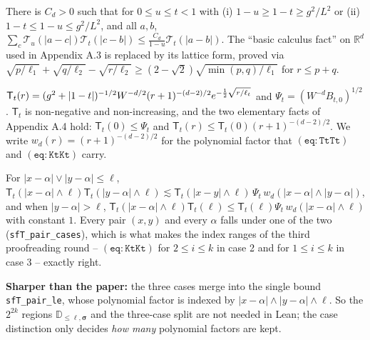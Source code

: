 \begin{lemma}\label{lem:propT-TTT2}
  \leanok
  There is $C_d>0$ such that for $0\le u\le t<1$ with (i) $1-u\ge1-t\ge g^2/L^2$ or
  (ii) $1-t\le1-u\le g^2/L^2$, and all $a,b$,
  $\sum_c\mathcal T_u(|a-c|)\mathcal T_t(|c-b|)\le\frac{C_d}{1-u}\mathcal T_t(|a-b|)$.
  The ``basic calculus fact'' on $\mathbb R^d$ used in Appendix A.3 is replaced by its
  lattice form, proved via $\sqrt{p/\ell_1}+\sqrt{q/\ell_2}-\sqrt{r/\ell_2}\ge(2-\sqrt2)\sqrt{\min(p,q)/\ell_1}$ for $r\le p+q$.
\end{lemma}



\begin{definition}\label{def:sfT}
  \leanok
  $\mathsf T_t(r)=(g^2+|1-t|)^{-1/2}W^{-d/2}(r+1)^{-(d-2)/2}e^{-\frac12\sqrt{r/\ell_t}}$ and
  $\Psi_t=(W^{-d}B_{t,0})^{1/2}$.  $\mathsf T_t$ is non-negative and non-increasing, and the
  two elementary facts of Appendix A.4 hold: $\mathsf T_t(0)\le\Psi_t$ and
  $\mathsf T_t(r)\le\mathsf T_t(0)(r+1)^{-(d-2)/2}$.  We write $w_d(r)=(r+1)^{-(d-2)/2}$ for the
  polynomial factor that $\mathtt{(eq{:}TtTt)}$ and $\mathtt{(eq{:}KtKt)}$ carry.
\end{definition}

\begin{lemma}\label{lem:TTk-pointwise}
  \leanok
  For $|x-\alpha|\vee|y-\alpha|\le\ell$,
  $\mathsf T_t(|x-\alpha|\wedge\ell)\mathsf T_t(|y-\alpha|\wedge\ell)\lesssim
   \mathsf T_t(|x-y|\wedge\ell)\,\Psi_t\,w_d(|x-\alpha|\wedge|y-\alpha|)$, and when
  $|y-\alpha|>\ell$, $\mathsf T_t(|x-\alpha|\wedge\ell)\mathsf T_t(\ell)\le
   \mathsf T_t(\ell)\Psi_t\,w_d(|x-\alpha|\wedge\ell)$ with constant $1$.
  Every pair $(x,y)$ and every $\alpha$ falls under one of the two (\texttt{sfT\_pair\_cases}),
  which is what makes the index ranges of the third proofreading round -- $\mathtt{(eq{:}KtKt)}$
  for $2\le i\le k$ in case 2 and for $1\le i\le k$ in case 3 -- exactly right.

  \textbf{Sharper than the paper:} the three cases merge into the single bound
  \texttt{sfT\_pair\_le}, whose polynomial factor is indexed by
  $|x-\alpha|\wedge|y-\alpha|\wedge\ell$.  So the $2^{2k}$ regions $\mathbb D_{\le\ell,\bm\sigma}$
  and the three-case split are not needed in Lean; the case distinction only decides
  \emph{how many} polynomial factors are kept.
\end{lemma}

